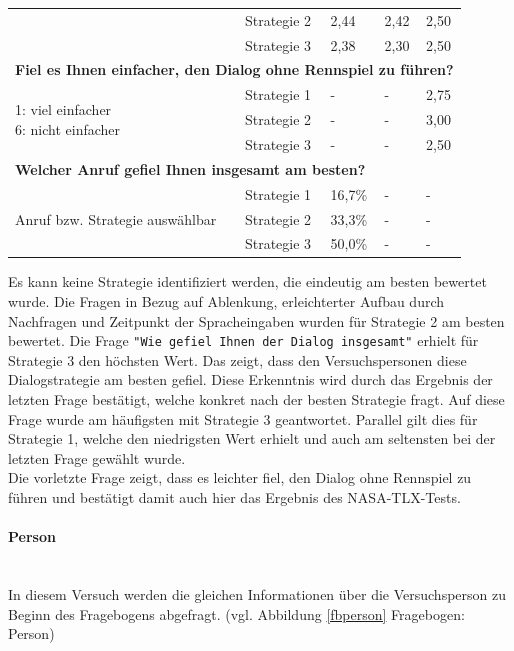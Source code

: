 \documentclass[12pt,a4paper]{scrartcl}
\begin{document}
\begin{longtable}{|p{4cm}|p{2cm}|p{2cm}|p{2cm}|p{2cm}|}
 & Strategie 2 & 2,44 & 2,42 & 2,50 \\
 & Strategie 3 & 2,38 & 2,30 & 2,50 \\
\hline
		\multicolumn{5}{l}{\textbf{Fiel es Ihnen einfacher, den Dialog ohne Rennspiel zu führen?}}\\
		\hline
\multirow{3}{4cm}{1: viel einfacher \newline  6: nicht einfacher} & Strategie 1 & - & - & 2,75 \\
 & Strategie 2 & - & - & 3,00 \\
 & Strategie 3 & - & - & 2,50\\
\hline
		\multicolumn{5}{l}{\textbf{Welcher Anruf gefiel Ihnen insgesamt am besten?}}\\
		\hline
\multirow{3}{4cm}{Anruf bzw. Strategie auswählbar} & Strategie 1 & 16,7\% &-  &-  \\
 & Strategie 2 & 33,3\% & - & - \\
 & Strategie 3 & 50,0\% & - &  -\\
\hline
\end{longtable}

Es kann keine Strategie identifiziert werden, die eindeutig am besten bewertet wurde. 
Die Fragen in Bezug auf Ablenkung, erleichterter Aufbau durch Nachfragen und Zeitpunkt der Spracheingaben wurden für Strategie 2 am besten bewertet.
Die Frage \texttt{"Wie gefiel Ihnen der Dialog insgesamt"} erhielt für Strategie 3 den höchsten Wert. Das zeigt, dass den Versuchspersonen diese Dialogstrategie am besten gefiel. Diese Erkenntnis wird durch das Ergebnis der letzten Frage bestätigt, welche konkret nach der besten Strategie fragt. Auf diese Frage wurde am häufigsten mit Strategie 3 geantwortet. Parallel gilt dies für Strategie 1, welche den niedrigsten Wert erhielt und auch am seltensten bei der letzten Frage gewählt wurde. \\

Die vorletzte Frage zeigt, dass es leichter fiel, den Dialog ohne Rennspiel zu führen und bestätigt damit auch hier das Ergebnis des NASA-TLX-Tests.

\paragraph{Person}
\label{fbperson2}
~\\
In diesem Versuch werden die gleichen Informationen über die Versuchsperson zu Beginn des Fragebogens abgefragt. (vgl. Abbildung \ref{fbperson}  Fragebogen: Person)\\
\end{document}
